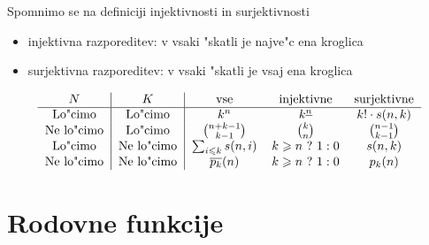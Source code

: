 \documentclass[a4paper,12pt]{article}
\theoremstyle{definition}
\theoremstyle{remark}
\newtheorem*{ex}{Primer}
\begin{document}
Spomnimo se na definiciji injektivnosti in surjektivnosti
\begin{itemize}
    \item injektivna razporeditev: v vsaki "skatli je najve"c ena kroglica
    \item surjektivna razporeditev: v vsaki "skatli je vsaj ena kroglica
\end{itemize}
\[\begin{tabular}{c|c|c c c}
    $N$ & $K$ & vse & injektivne & surjektivne \\
\hline
    Lo"cimo & Lo"cimo & $k^n$ & $k^{\underline{n}}$ & $k!\cdot s(n, k)$\\
    Ne lo"cimo & Lo"cimo & $\binom{n + k - 1}{k - 1}$ & $\binom{k}{n}$ & $\binom{n - 1}{k - 1}$\\
    Lo"cimo & Ne lo"cimo & $\sum_{i \leqslant k} s(n, i)$ & $k \geqslant n \ ? \ 1 : 0$ & $s(n, k)$\\
    Ne lo"cimo & Ne lo"cimo & $\overline{p_k}(n)$ & $k \geqslant n \ ? \ 1:0$ & $p_k(n)$ \\
\end{tabular}\]



%	

\section{Rodovne funkcije}
\end{document}
